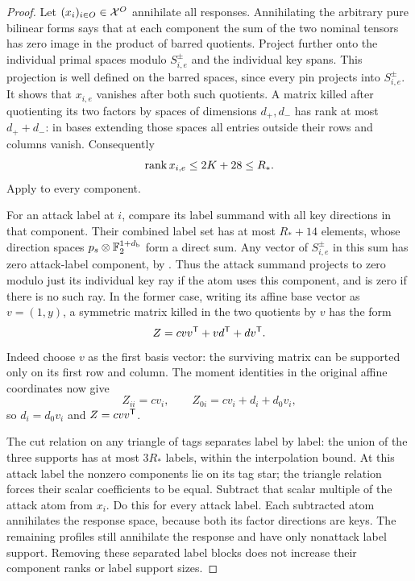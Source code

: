 \begin{proof}
Let $(x_i)_{i\in O}\in\mathcal X^O$ annihilate all responses.
Annihilating the arbitrary pure bilinear forms says that at
each component the sum of the two nominal tensors has zero
image in the product of barred quotients.  Project further
onto the individual primal spaces modulo
$S_{i,e}^{\pm}$ and the individual key spans.  This projection
is well defined on the barred spaces, since every pin
projects into $S_{i,e}^{\pm}$.  It shows that $x_{i,e}$ vanishes
after both such quotients.  A matrix killed after quotienting
its two factors by spaces of dimensions $d_+,d_-$ has rank
at most $d_++d_-$: in bases extending those spaces all entries
outside their rows and columns vanish.  Consequently
\[
 \operatorname{rank} x_{i,e}\le2K+28\le R_*.
\]
Apply  to every component.

For an attack label at $i$, compare its label summand with
all key directions in that component.  Their combined label
set has at most $R_*+14$ elements, whose direction spaces
$p_s\otimes\mathbb F_2^{1+d_{\mathrm b}}$ form a direct sum.  Any vector of
$S_{i,e}^{\pm}$ in this sum has zero attack-label component,
by .  Thus the attack summand
projects to zero modulo just its individual key ray if the
atom uses this component, and is zero if there is no such
ray.  In the former case, writing its affine base vector as
$v=(1,y)$, a symmetric matrix killed in the two quotients
by $v$ has the form
\[
 Z=cvv^{\mathsf T}+vd^{\mathsf T}+dv^{\mathsf T}.
\]
Indeed choose $v$ as the first basis vector: the surviving
matrix can be supported only on its first row and column.
The moment identities in the original affine coordinates
now give
\[
 Z_{ii}=cv_i,\qquad Z_{0i}=cv_i+d_i+d_0v_i,
\]
so $d_i=d_0v_i$ and $Z=cvv^{\mathsf T}$.

The cut relation on any triangle of tags separates label by
label: the union of the three supports has at most $3R_*$
labels, within the interpolation bound.  At this attack
label the nonzero components lie on its tag star; the
triangle relation forces their scalar coefficients to be
equal.  Subtract that scalar multiple of the attack atom
from $x_i$.  Do this for every attack label.  Each subtracted
atom annihilates the response space, because both its factor
directions are keys.  The remaining profiles still
annihilate the response and have only nonattack label
support.  Removing these separated label blocks does not
increase their component ranks or label support sizes.


\end{proof}
